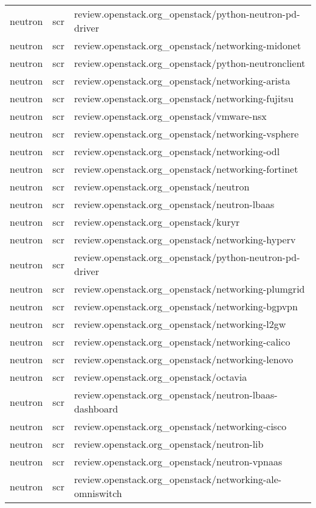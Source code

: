\begin{center}
\begin{longtable}{|p{4cm}|p{1cm}|p{10cm}|}
neutron&scr&review.openstack.org\_openstack/python-neutron-pd-driver\\ 
neutron&scr&review.openstack.org\_openstack/networking-midonet\\ 
neutron&scr&review.openstack.org\_openstack/python-neutronclient\\ 
neutron&scr&review.openstack.org\_openstack/networking-arista\\ 
neutron&scr&review.openstack.org\_openstack/networking-fujitsu\\ 
neutron&scr&review.openstack.org\_openstack/vmware-nsx\\ 
neutron&scr&review.openstack.org\_openstack/networking-vsphere\\ 
neutron&scr&review.openstack.org\_openstack/networking-odl\\ 
neutron&scr&review.openstack.org\_openstack/networking-fortinet\\ 
neutron&scr&review.openstack.org\_openstack/neutron\\ 
neutron&scr&review.openstack.org\_openstack/neutron-lbaas\\ 
neutron&scr&review.openstack.org\_openstack/kuryr\\ 
neutron&scr&review.openstack.org\_openstack/networking-hyperv\\ 
neutron&scr&review.openstack.org\_openstack/python-neutron-pd-driver\\ 
neutron&scr&review.openstack.org\_openstack/networking-plumgrid\\ 
neutron&scr&review.openstack.org\_openstack/networking-bgpvpn\\ 
neutron&scr&review.openstack.org\_openstack/networking-l2gw\\ 
neutron&scr&review.openstack.org\_openstack/networking-calico\\ 
neutron&scr&review.openstack.org\_openstack/networking-lenovo\\ 
neutron&scr&review.openstack.org\_openstack/octavia\\ 
neutron&scr&review.openstack.org\_openstack/neutron-lbaas-dashboard\\ 
neutron&scr&review.openstack.org\_openstack/networking-cisco\\ 
neutron&scr&review.openstack.org\_openstack/neutron-lib\\ 
neutron&scr&review.openstack.org\_openstack/neutron-vpnaas\\ 
neutron&scr&review.openstack.org\_openstack/networking-ale-omniswitch\\ 

\end{longtable}
\end{center}

